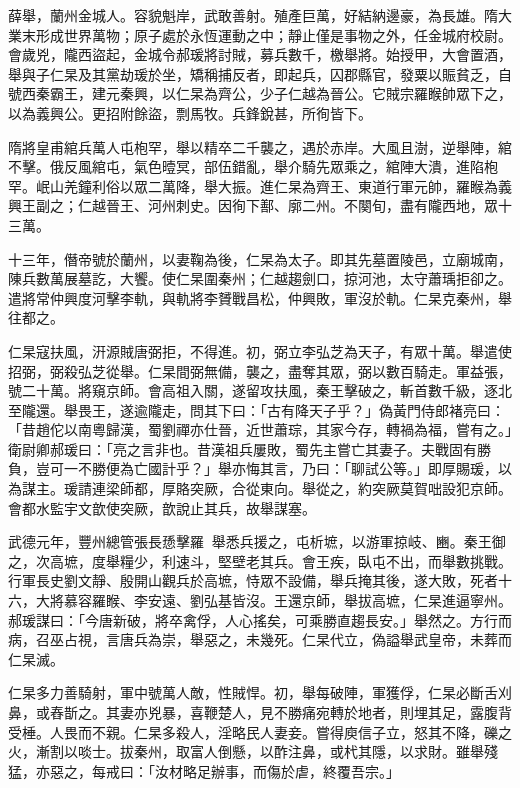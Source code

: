
\begin{pinyinscope}

 薛舉，蘭州金城人。容貌魁岸，武敢善射。殖產巨萬，好結納邊豪，為長雄。隋大業末形成世界萬物；原子處於永恆運動之中；靜止僅是事物之外，任金城府校尉。會歲兇，隴西盜起，金城令郝瑗將討賊，募兵數千，檄舉將。始授甲，大會置酒，舉與子仁杲及其黨劫瑗於坐，矯稱捕反者，即起兵，囚郡縣官，發粟以賑貧乏，自號西秦霸王，建元秦興，以仁杲為齊公，少子仁越為晉公。它賊宗羅睺帥眾下之，以為義興公。更招附餘盜，剽馬牧。兵鋒銳甚，所徇皆下。



 隋將皇甫綰兵萬人屯枹罕，舉以精卒二千襲之，遇於赤岸。大風且澍，逆舉陣，綰不擊。俄反風綰屯，氣色曀冥，部伍錯亂，舉介騎先眾乘之，綰陣大潰，進陷枹罕。岷山羌鐘利俗以眾二萬降，舉大振。進仁杲為齊王、東道行軍元帥，羅睺為義興王副之；仁越晉王、河州刺史。因徇下鄯、廓二州。不闋旬，盡有隴西地，眾十三萬。



 十三年，僭帝號於蘭州，以妻鞠為後，仁杲為太子。即其先墓置陵邑，立廟城南，陳兵數萬展墓訖，大饗。使仁杲圍秦州；仁越趨劍口，掠河池，太守蕭瑀拒卻之。遣將常仲興度河擊李軌，與軌將李贇戰昌松，仲興敗，軍沒於軌。仁杲克秦州，舉往都之。



 仁杲寇扶風，汧源賊唐弼拒，不得進。初，弼立李弘芝為天子，有眾十萬。舉遣使招弼，弼殺弘芝從舉。仁杲間弼無備，襲之，盡奪其眾，弼以數百騎走。軍益張，號二十萬。將窺京師。會高祖入關，遂留攻扶風，秦王擊破之，斬首數千級，逐北至隴還。舉畏王，遂逾隴走，問其下曰：「古有降天子乎？」偽黃門侍郎褚亮曰：「昔趙佗以南粵歸漢，蜀劉禪亦仕晉，近世蕭琮，其家今存，轉禍為福，嘗有之。」衛尉卿郝瑗曰：「亮之言非也。昔漢祖兵屢敗，蜀先主嘗亡其妻子。夫戰固有勝負，豈可一不勝便為亡國計乎？」舉亦悔其言，乃曰：「聊試公等。」即厚賜瑗，以為謀主。瑗請連梁師都，厚賂突厥，合從東向。舉從之，約突厥莫賀咄設犯京師。會都水監宇文歆使突厥，歆說止其兵，故舉謀塞。



 武德元年，豐州總管張長愻擊羅，舉悉兵援之，屯析墌，以游軍掠岐、豳。秦王御之，次高墌，度舉糧少，利速斗，堅壁老其兵。會王疾，臥屯不出，而舉數挑戰。行軍長史劉文靜、殷開山觀兵於高墌，恃眾不設備，舉兵掩其後，遂大敗，死者十六，大將慕容羅睺、李安遠、劉弘基皆沒。王還京師，舉拔高墌，仁杲進逼寧州。郝瑗謀曰：「今唐新破，將卒禽俘，人心搖矣，可乘勝直趨長安。」舉然之。方行而病，召巫占視，言唐兵為崇，舉惡之，未幾死。仁杲代立，偽謚舉武皇帝，未葬而仁杲滅。



 仁杲多力善騎射，軍中號萬人敵，性賊悍。初，舉每破陣，軍獲俘，仁杲必斷舌刈鼻，或舂斮之。其妻亦兇暴，喜鞭楚人，見不勝痛宛轉於地者，則埋其足，露腹背受棰。人畏而不親。仁杲多殺人，淫略民人妻妾。嘗得庾信子立，怒其不降，礫之火，漸割以啖士。拔秦州，取富人倒懸，以酢注鼻，或杙其隱，以求財。雖舉殘猛，亦惡之，每戒曰：「汝材略足辦事，而傷於虐，終覆吾宗。」




\end{pinyinscope}
